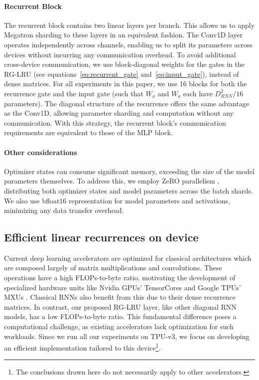 \paragraph{Recurrent Block}

The recurrent block contains two linear layers per branch. This allows us to apply Megatron sharding to these layers in an equivalent fashion. The Conv1D layer operates independently across channels, enabling us to split its parameters across devices without incurring any communication overhead. To avoid additional cross-device communication, we use block-diagonal weights for the gates in the RG-LRU (see equations~\ref{eq:recurrent_gate} and~\ref{eq:input_gate}), instead of dense matrices. For all experiments in this paper, we use 16 blocks for both the recurrence gate and the input gate (such that $W_x$ and $W_a$ each have $D_{RNN}^2/16$ parameters). The diagonal structure of the recurrence offers the same advantage as the Conv1D, allowing parameter sharding and computation without any communication. With this strategy, the recurrent block's communication requirements are equivalent to those of the MLP block.

\paragraph{Other considerations}

Optimizer states can consume significant memory, exceeding the size of the model parameters themselves. To address this, we employ ZeRO parallelism \citep{rajbhandari2020zero}, distributing both optimizer states and model parameters across the batch shards. We also use bfloat16 representation for model parameters and activations, minimizing any data transfer overhead.

\subsection{Efficient linear recurrences on device}
\label{sec:training_rnn}

Current deep learning accelerators are optimized for classical architectures which are composed largely of matrix multiplications and convolutions. These operations have a high FLOPs-to-byte ratio, motivating the development of specialized hardware units like Nvidia GPUs' TensorCores  \citep{markidis2018nvidia} and Google TPUs' MXUs \citep{norrie2021design, jouppi2021ten, jouppi2023tpu}. Classical RNNs also benefit from this due to their dense recurrence matrices. In contrast, our proposed RG-LRU layer, like other diagonal RNN models, has a low FLOPs-to-byte ratio. This fundamental difference poses a computational challenge, as existing accelerators lack optimization for such workloads. Since we run all our experiments on TPU-v3, we focus on developing an efficient implementation tailored to this device\footnote{The conclusions drawn here do not necessarily apply to other accelerators.}.

